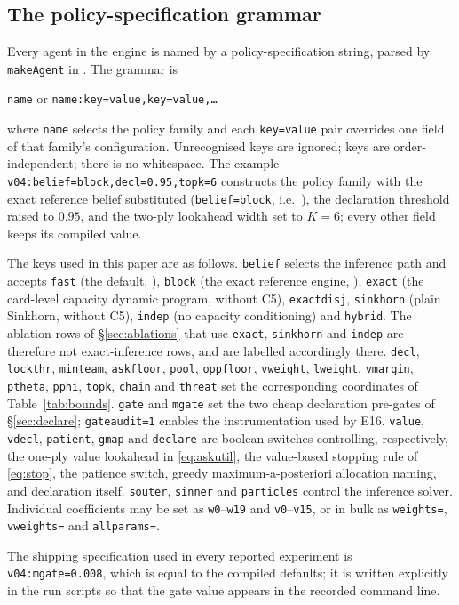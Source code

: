 \subsection{The policy-specification grammar}

Every agent in the engine is named by a policy-specification string, parsed by
\texttt{makeAgent} in . The grammar is

\begin{center}
\texttt{name} \quad or \quad \texttt{name:key=value,key=value,\dots}
\end{center}

\noindent where \texttt{name} selects the policy family and each
\texttt{key=value} pair overrides one field of that family's configuration.
Unrecognised keys are ignored; keys are order-independent; there is no
whitespace. The example \texttt{v04:belief=block,decl=0.95,topk=6} constructs the
\vfast{} policy family with the exact reference belief substituted
(\texttt{belief=block}, i.e.\ \vblock{}), the declaration threshold raised to
$0.95$, and the two-ply lookahead width set to $K = 6$; every other field keeps
its compiled value.

The keys used in this paper are as follows. \texttt{belief} selects the inference
path and accepts \texttt{fast} (the default, \vfast{}), \texttt{block} (the exact
reference engine, \vblock{}), \texttt{exact} (the card-level capacity dynamic
program, without C5), \texttt{exactdisj}, \texttt{sinkhorn} (plain Sinkhorn,
without C5), \texttt{indep} (no capacity conditioning) and \texttt{hybrid}. The
ablation rows of \S\ref{sec:ablations} that use \texttt{exact},
\texttt{sinkhorn} and \texttt{indep} are therefore not exact-inference rows, and
are labelled accordingly there. \texttt{decl}, \texttt{lockthr},
\texttt{minteam}, \texttt{askfloor}, \texttt{pool}, \texttt{oppfloor},
\texttt{vweight}, \texttt{lweight}, \texttt{vmargin}, \texttt{ptheta},
\texttt{pphi}, \texttt{topk}, \texttt{chain} and \texttt{threat} set the
corresponding coordinates of Table~\ref{tab:bounds}. \texttt{gate} and
\texttt{mgate} set the two cheap declaration pre-gates of \S\ref{sec:declare};
\texttt{gateaudit=1} enables the instrumentation used by E16. \texttt{value},
\texttt{vdecl}, \texttt{patient}, \texttt{gmap} and \texttt{declare} are boolean
switches controlling, respectively, the one-ply value lookahead in
\eqref{eq:askutil}, the value-based stopping rule of \eqref{eq:stop}, the
patience switch, greedy maximum-a-posteriori allocation naming, and declaration
itself. \texttt{souter}, \texttt{sinner} and \texttt{particles} control the
inference solver. Individual coefficients may be set as \texttt{w0}--\texttt{w19}
and \texttt{v0}--\texttt{v15}, or in bulk as \texttt{weights=},
\texttt{vweights=} and \texttt{allparams=}.

The shipping specification used in every reported experiment is
\texttt{v04:mgate=0.008}, which is equal to the compiled defaults; it is written
explicitly in the run scripts so that the gate value appears in the recorded
command line.
